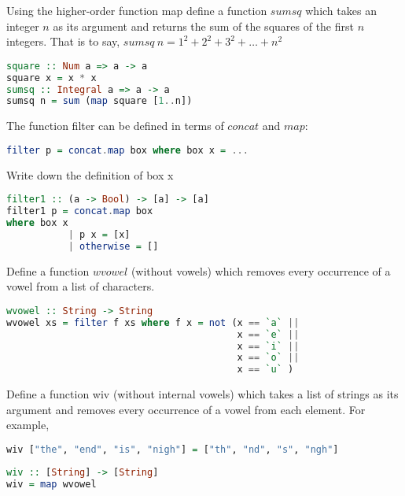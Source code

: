 \documentclass{article}
\begin{document}
\begin{Exercise} [difficulty=3]
Using the higher-order function map define a function $sumsq$ which takes an
integer $n$ as its argument and returns the sum of the squares of the first $n$
integers. That is to say,
$sumsq \ n = 1^{2} + 2^{2} + 3^{2} + \ldots + n^{2}$
\end{Exercise} 
\begin{Answer}
\begin{lstlisting}[language=Haskell]
square :: Num a => a -> a
square x = x * x
sumsq :: Integral a => a -> a
sumsq n = sum (map square [1..n])
\end{lstlisting}
\end{Answer}
\pagebreak
\begin{Exercise} [difficulty=4]
The function filter can be defined in terms of $concat$ and $map$:
\begin{lstlisting}[language=Haskell]
filter p = concat.map box where box x = ...
\end{lstlisting}
Write down the definition of box x   
\end{Exercise} 
\begin{Answer}
\begin{lstlisting}[language=Haskell]
filter1 :: (a -> Bool) -> [a] -> [a]
filter1 p = concat.map box
where box x
           | p x = [x]
           | otherwise = []
\end{lstlisting}
\end{Answer}

\begin{Exercise} [difficulty=3]
Define a function $wvowel$ (without vowels) which removes every occurrence of a
vowel from a list of characters.
\end{Exercise} 
\begin{Answer}
\begin{lstlisting}[language=Haskell]
wvowel :: String -> String
wvowel xs = filter f xs where f x = not (x == `a` ||
                                         x == `e` ||
                                         x == `i` ||
                                         x == `o` ||
                                         x == `u` )
\end{lstlisting}
\end{Answer}

\begin{Exercise} [difficulty=4]
 Define a function wiv (without internal vowels) which takes a list of strings as its
argument and removes every occurrence of a vowel from each element. For example, 
\begin{lstlisting}[language=Haskell]
wiv ["the", "end", "is", "nigh"] = ["th", "nd", "s", "ngh"] 
\end{lstlisting}
\end{Exercise} 
\begin{Answer}
\begin{lstlisting}[language=Haskell]
wiv :: [String] -> [String]
wiv = map wvowel
\end{lstlisting}
\end{Answer}
\end{document}
